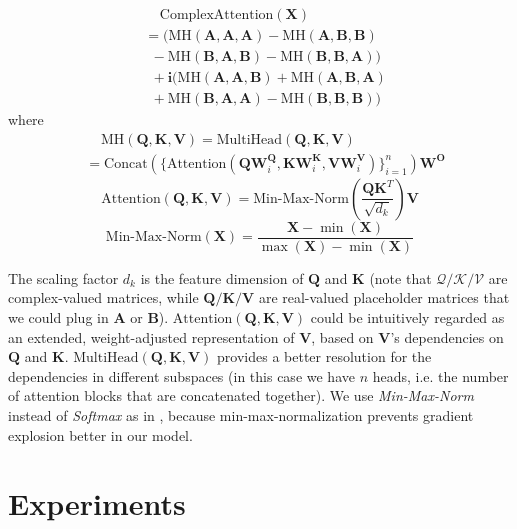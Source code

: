 \documentclass{article}
\def\vi{{\mathbf i}}
\def\mX{{\mathbf X}}
\def\mA{{\mathbf A}}
\def\mB{{\mathbf B}}
\def\mW{{\mathbf W}}
\def\mQ{{\mathbf Q}}
\def\mK{{\mathbf K}}
\def\mV{{\mathbf V}}
\def\mO{{\mathbf O}}
\begin{document}
\begin{equation}
\label{eq:equation3}
\begin{split}
&\ \ \ \ \ \text{ComplexAttention}(\mX) \\
& = (\text{MH}(\mA, \mA, \mA) - \text{MH}(\mA, \mB, \mB) \\
&\ \ - \text{MH}(\mB, \mA, \mB) -\text{MH}(\mB, \mB, \mA)) \\ 
&\ \ + \vi(\text{MH}(\mA, \mA, \mB) + \text{MH}(\mA, \mB, \mA) \\
&\ \ +\text{MH}(\mB, \mA, \mA) - \text{MH}(\mB, \mB, \mB))
\end{split}
\end{equation}
where
\begin{equation}
\begin{split}
&\ \ \ \ \ \text{MH}(\mQ, \mK, \mV) = \text{MultiHead}(\mQ, \mK, \mV) \\
& = \text{Concat}(\{\text{Attention}(\mQ\mW_i^{\mQ}, \mK\mW_i^{\mK}, \mV\mW_i^{\mV})\}_{i=1}^n)\mW^{\mO}
\end{split}
\end{equation}
\begin{equation}
    \text{Attention}(\mQ, \mK, \mV) = \text{Min-Max-Norm}(\frac{\mQ\mK^T}{\sqrt{d_k}})\mV
\end{equation}
\begin{equation}
\label{eq:equation6}
    \text{Min-Max-Norm}(\mX) = \frac{\mX - \min(\mX)}{\max(\mX) - \min(\mX)}
\end{equation}

The scaling factor $d_k$ is the feature dimension of $\mQ$ and $\mK$ (note that $\boldsymbol{\mathcal{Q/K/V}}$ are complex-valued matrices, while $\mQ/\mK/\mV$ are real-valued placeholder matrices that we could plug in $\mA$ or $\mB$). $\text{Attention}(\mQ, \mK, \mV)$ could be intuitively regarded as an extended, weight-adjusted representation of $\mV$, based on $\mV$'s dependencies on $\mQ$ and $\mK$.  $\text{MultiHead}(\mQ, \mK, \mV)$ provides a better resolution for the dependencies in different subspaces \cite{tsaikernel} (in this case we have $n$ heads, i.e. the number of attention blocks that are concatenated together). We use \textit{Min-Max-Norm} instead of \textit{Softmax} as in \cite{vaswani2017attention}, because min-max-normalization prevents gradient explosion better in our model.

\section{Experiments}
\end{document}

